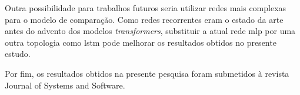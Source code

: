 Outra possibilidade para trabalhos futuros seria utilizar redes mais complexas para o modelo de comparação. Como redes recorrentes eram o estado da arte antes do advento dos modelos \textit{transformers}, substituir a atual rede \gls{mlp} por uma outra topologia como \gls{lstm} pode melhorar os resultados obtidos no presente estudo.

Por fim, os resultados obtidos na presente pesquisa foram submetidos à revista Journal of Systems and Software.